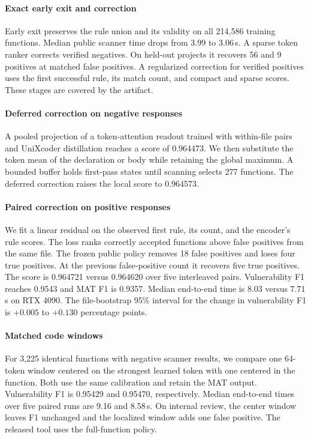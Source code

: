 \documentclass[10pt,conference]{IEEEtran}
\begin{document}
\paragraph{Exact early exit and correction}
Early exit preserves the rule union and its validity on all 214,586 training
functions. Median public scanner time drops from 3.99 to 3.06\,s. A sparse
token ranker corrects verified negatives. On held-out projects it recovers
56 and 9 positives at matched false positives. A regularized correction
for verified positives uses the first successful rule, its match count,
and compact and sparse scores. These stages are covered by the artifact.

\paragraph{Deferred correction on negative responses}
A pooled projection of a token-attention readout trained with
within-file pairs and UniXcoder distillation reaches a score of
0.964473. We then substitute the token mean of the declaration
or body while retaining the global maximum. A bounded buffer
holds first-pass states until scanning selects 277 functions.
The deferred correction raises the local score to 0.964573.

\paragraph{Paired correction on positive responses}
We fit a linear residual on the observed first rule, its count,
and the encoder's rule scores. The loss ranks correctly accepted
functions above false positives from the same file. The frozen
public policy removes 18 false positives and loses four true
positives. At the previous false-positive count it recovers five
true positives. The score is 0.964721 versus 0.964620 over five
interleaved pairs. Vulnerability F1 reaches 0.9543 and MAT F1 is
0.9357. Median end-to-end time is 8.03 versus 7.71\,s on RTX 4090.
The file-bootstrap 95\% interval for the change in vulnerability
F1 is $+0.005$ to $+0.130$ percentage points.

\paragraph{Matched code windows}
For 3,225 identical functions with negative scanner results, we compare
one 64-token window centered on the strongest learned token with one
centered in the function. Both use the same calibration and retain the MAT
output. Vulnerability F1 is 0.95429 and 0.95470, respectively. Median
end-to-end times over five paired runs are 9.16 and 8.58\,s. On internal
review, the center window leaves F1 unchanged and the localized window
adds one false positive. The released tool uses the full-function policy.
\end{document}
